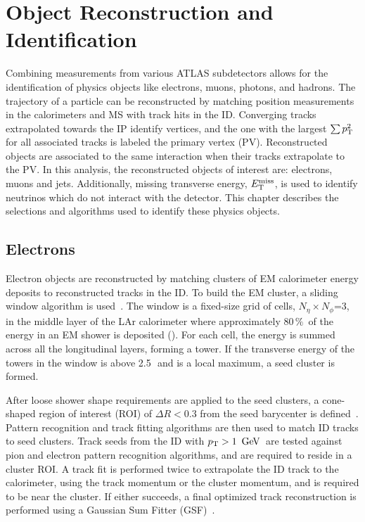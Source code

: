 \chapter{Object Reconstruction and Identification}
\label{ch:objreco}

Combining measurements from various ATLAS subdetectors allows for the identification of physics objects like electrons, muons, photons, and hadrons. The trajectory of a particle can be reconstructed by matching position measurements in the calorimeters and MS with track hits in the ID. Converging tracks extrapolated towards the IP identify vertices, and the one with the largest $\sum p_{\text{T}}^2$ for all associated tracks is labeled the primary vertex (PV).  Reconstructed objects are associated to the same interaction when their tracks extrapolate to the PV. In this analysis, the reconstructed objects of interest are: electrons, muons and jets. Additionally, missing transverse energy, $E_{\text{T}}^{\text{miss}}$, is used to identify neutrinos which do not interact with the detector. This chapter describes the selections and algorithms used to identify these physics objects.

%
\section{Electrons}
\label{ch:objreco:el}
Electron objects are reconstructed by matching clusters of EM calorimeter energy deposits to reconstructed tracks in the ID. To build the EM cluster, a sliding window algorithm is used~\cite{sliding_window}. The window is a fixed-size grid of cells, $N_{\eta}\times N_{\phi}$=3, in the middle layer of the LAr calorimeter where approximately $80\,\%$\, of the energy in an EM shower is deposited (\Sect{\ref{ch:atlas:particle_showers}}). For each cell, the energy is summed across all the longitudinal layers, forming a tower. If the transverse energy of the towers in the window is above 2.5\,\GeV\, and is a local maximum, a seed cluster is formed. 

After loose shower shape requirements are applied to the seed clusters, a cone-shaped region of interest (ROI) of $\Delta R<0.3$ from the seed barycenter is defined~\cite{electron_efficiency, electron_efficiency_2016}.  Pattern recognition and track fitting algorithms are then used to match ID tracks to seed clusters. Track seeds from the ID with $\pT>1\,\GeV$\, are tested against pion and electron pattern recognition algorithms, and are required to reside in a cluster ROI. A track fit is performed twice to extrapolate the ID track to the calorimeter, using the track momentum or the cluster momentum, and is required to be near the cluster. If either succeeds, a final optimized track reconstruction is performed using a Gaussian Sum Fitter (GSF)~\cite{gsm_filter}. 

